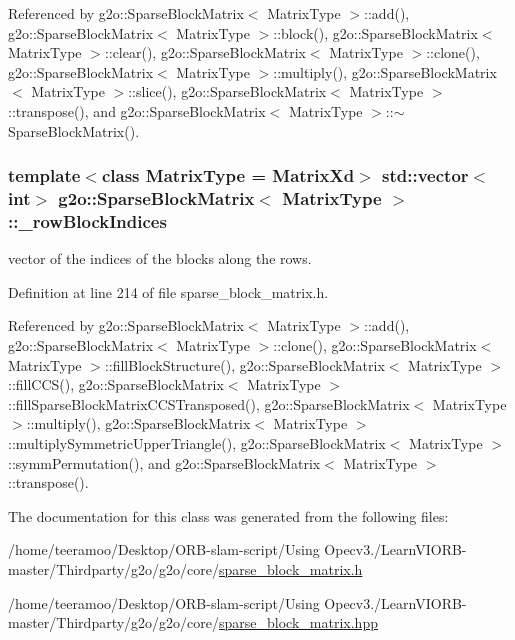 Referenced by g2o\+::\+Sparse\+Block\+Matrix$<$ Matrix\+Type $>$\+::add(), g2o\+::\+Sparse\+Block\+Matrix$<$ Matrix\+Type $>$\+::block(), g2o\+::\+Sparse\+Block\+Matrix$<$ Matrix\+Type $>$\+::clear(), g2o\+::\+Sparse\+Block\+Matrix$<$ Matrix\+Type $>$\+::clone(), g2o\+::\+Sparse\+Block\+Matrix$<$ Matrix\+Type $>$\+::multiply(), g2o\+::\+Sparse\+Block\+Matrix$<$ Matrix\+Type $>$\+::slice(), g2o\+::\+Sparse\+Block\+Matrix$<$ Matrix\+Type $>$\+::transpose(), and g2o\+::\+Sparse\+Block\+Matrix$<$ Matrix\+Type $>$\+::$\sim$\+Sparse\+Block\+Matrix().

\subsubsection[{\texorpdfstring{\+\_\+row\+Block\+Indices}{_rowBlockIndices}}]{\setlength{\rightskip}{0pt plus 5cm}template$<$class Matrix\+Type = Matrix\+Xd$>$ std\+::vector$<$int$>$ {\bf g2o\+::\+Sparse\+Block\+Matrix}$<$ Matrix\+Type $>$\+::\+\_\+row\+Block\+Indices\hspace{0.3cm}{\ttfamily [protected]}}\hypertarget{classg2o_1_1SparseBlockMatrix_ab0bd9c6d5b7b8704af1bc679032382e3}{}\label{classg2o_1_1SparseBlockMatrix_ab0bd9c6d5b7b8704af1bc679032382e3}


vector of the indices of the blocks along the rows. 



Definition at line 214 of file sparse\+\_\+block\+\_\+matrix.\+h.



Referenced by g2o\+::\+Sparse\+Block\+Matrix$<$ Matrix\+Type $>$\+::add(), g2o\+::\+Sparse\+Block\+Matrix$<$ Matrix\+Type $>$\+::clone(), g2o\+::\+Sparse\+Block\+Matrix$<$ Matrix\+Type $>$\+::fill\+Block\+Structure(), g2o\+::\+Sparse\+Block\+Matrix$<$ Matrix\+Type $>$\+::fill\+C\+C\+S(), g2o\+::\+Sparse\+Block\+Matrix$<$ Matrix\+Type $>$\+::fill\+Sparse\+Block\+Matrix\+C\+C\+S\+Transposed(), g2o\+::\+Sparse\+Block\+Matrix$<$ Matrix\+Type $>$\+::multiply(), g2o\+::\+Sparse\+Block\+Matrix$<$ Matrix\+Type $>$\+::multiply\+Symmetric\+Upper\+Triangle(), g2o\+::\+Sparse\+Block\+Matrix$<$ Matrix\+Type $>$\+::symm\+Permutation(), and g2o\+::\+Sparse\+Block\+Matrix$<$ Matrix\+Type $>$\+::transpose().



The documentation for this class was generated from the following files\+:\begin{DoxyCompactItemize}
\item 
/home/teeramoo/\+Desktop/\+O\+R\+B-\/slam-\/script/\+Using Opecv3./\+Learn\+V\+I\+O\+R\+B-\/master/\+Thirdparty/g2o/g2o/core/\hyperlink{sparse__block__matrix_8h}{sparse\+\_\+block\+\_\+matrix.\+h}\item 
/home/teeramoo/\+Desktop/\+O\+R\+B-\/slam-\/script/\+Using Opecv3./\+Learn\+V\+I\+O\+R\+B-\/master/\+Thirdparty/g2o/g2o/core/\hyperlink{sparse__block__matrix_8hpp}{sparse\+\_\+block\+\_\+matrix.\+hpp}\end{DoxyCompactItemize}
